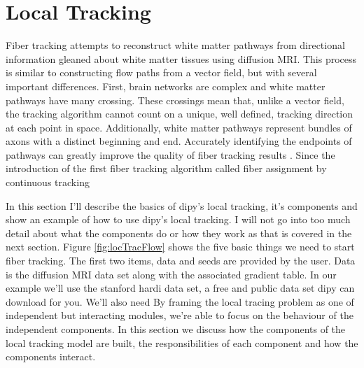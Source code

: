 \section{Local Tracking}
    Fiber tracking attempts to reconstruct white matter pathways from directional information gleaned about white matter tissues using diffusion MRI. This process is similar to constructing flow paths from a vector field, but with several important differences. First, brain networks are complex and white matter pathways have many crossing. These crossings mean that, unlike a vector field, the tracking algorithm cannot count on a unique, well defined, tracking direction at each point in space. Additionally, white matter pathways represent bundles of axons with a distinct beginning and end. Accurately identifying the endpoints of pathways can greatly improve the quality of fiber tracking results \cite{Smith_2012}. Since the introduction of the first fiber tracking algorithm called fiber assignment by continuous tracking \cite{Mori_1999}


In this section I'll describe the basics of dipy's local tracking, it's components and show an example of how to use dipy's local tracking. I will not go into too much detail about what the components do or how they work as that is covered in the next section. Figure \ref{fig:locTracFlow} shows the five basic things we need to start fiber tracking. The first two items, data and seeds are provided by the user. Data is the diffusion MRI data set along with the associated gradient table. In our example we'll use the stanford hardi data set, a free and public data set dipy can download for you. We'll also need 
    By framing the local tracing problem as one of independent but interacting modules, we're able to focus on the behaviour of the independent components. In this section we discuss how the components of the local tracking model are built, the responsibilities of each component and how the components interact.

